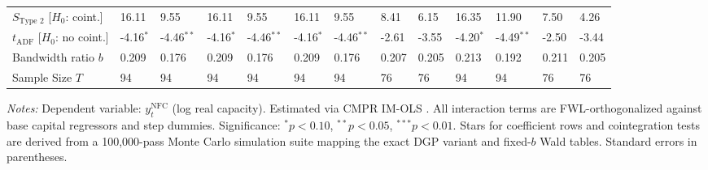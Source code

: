 \begin{table}[h!]
\begin{tabular}{p{3.2cm}p{1.0cm}p{1.0cm}p{1.0cm}p{1.0cm}p{1.0cm}p{1.0cm}p{1.0cm}p{1.0cm}p{1.0cm}p{1.0cm}p{1.0cm}p{1.0cm}}
$S_{\text{Type 2}}$ [$H_0$: coint.] & 16.11 & 9.55 & 16.11 & 9.55 & 16.11 & 9.55 & 8.41 & 6.15 & 16.35 & 11.90 & 7.50 & 4.26 \\
$t_{\text{ADF}}$ [$H_0$: no coint.] & -4.16$^{*}$ & -4.46$^{**}$ & -4.16$^{*}$ & -4.46$^{**}$ & -4.16$^{*}$ & -4.46$^{**}$ & -2.61 & -3.55 & -4.20$^{*}$ & -4.49$^{**}$ & -2.50 & -3.44 \\
Bandwidth ratio $b$ & 0.209 & 0.176 & 0.209 & 0.176 & 0.209 & 0.176 & 0.207 & 0.205 & 0.213 & 0.192 & 0.211 & 0.205 \\
Sample Size $T$ & 94 & 94 & 94 & 94 & 94 & 94 & 76 & 76 & 94 & 94 & 76 & 76 \\
\bottomrule
\end{tabular}
\begin{minipage}{\textwidth}
\scriptsize
\textit{Notes:} Dependent variable: $y_t^{\text{NFC}}$ (log real capacity). Estimated via CMPR IM-OLS \citep{VogelsangWagner2024}. All interaction terms are FWL-orthogonalized against base capital regressors and step dummies. Significance: $^*p<0.10$, $^{**}p<0.05$, $^{***}p<0.01$. Stars for coefficient rows and cointegration tests are derived from a 100,000-pass Monte Carlo simulation suite mapping the exact DGP variant and fixed-$b$ Wald tables. Standard errors in parentheses.
\end{minipage}
\end{table}


